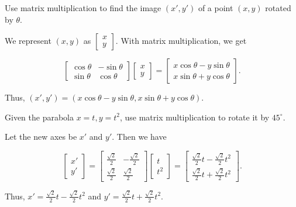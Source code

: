 \documentclass[../gatm_answers.tex]{subfiles}
\begin{document}
\begin{outer_problem}
\item Use matrix multiplication to find the image $(x',y')$ of a point $(x,y)$ rotated by $\theta$.
\end{outer_problem}

We represent $(x,y)$ as $\begin{bmatrix} x \\ y \end{bmatrix}$. With matrix multiplication, we get

$$\begin{bmatrix} \cos\theta & -\sin\theta \\ \sin\theta & \cos\theta \end{bmatrix} \begin{bmatrix} x \\ y \end{bmatrix} = \begin{bmatrix} x\cos\theta - y\sin\theta \\ x\sin\theta + y\cos\theta \end{bmatrix}.$$

Thus, $(x',y')=(x\cos\theta - y\sin\theta, x\sin\theta + y\cos\theta)$.

\begin{outer_problem}
\item Given the parabola $x=t,y=t^2$, use matrix multiplication to rotate it by $45^\circ$.
\end{outer_problem}

Let the new axes be $x'$ and $y'$. Then we have

$$\begin{bmatrix} x' \\ y' \end{bmatrix} = \begin{bmatrix} \frac{\sqrt{2}}{2} & -\frac{\sqrt{2}}{2} \\ \frac{\sqrt{2}}{2} & \frac{\sqrt{2}}{2} \end{bmatrix} \begin{bmatrix} t \\ t^2 \end{bmatrix} = \begin{bmatrix} \frac{\sqrt{2}}{2}t - \frac{\sqrt{2}}{2}t^2 \\ \frac{\sqrt{2}}{2}t + \frac{\sqrt{2}}{2}t^2 \end{bmatrix}.$$

Thus, $x' = \frac{\sqrt{2}}{2}t - \frac{\sqrt{2}}{2}t^2$ and $y' = \frac{\sqrt{2}}{2}t + \frac{\sqrt{2}}{2}t^2$.
\end{document}

